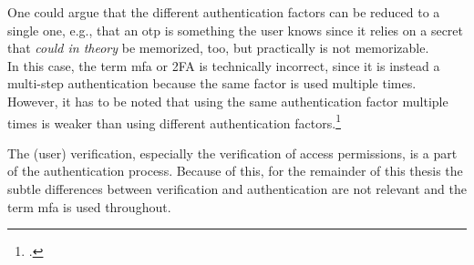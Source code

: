 One could argue that the different authentication factors can be reduced to a single one, e.g., that an \gls{otp} is \frqq something the user knows\flqq{} since it relies on a secret that \textit{could in theory} be memorized, too, but practically is not memorizable.\\
In this case, the term \gls{mfa} or 2FA is technically incorrect, since it is instead a multi-step authentication because the same factor is used multiple times. However, it has to be noted that using the same authentication factor multiple times is weaker than using different authentication factors.\footcite[See][117]{grimes2017hacking}

The (user) verification, especially the verification of access permissions, is a part of the authentication process. Because of this, for the remainder of this thesis the subtle differences between verification and authentication are not relevant and the term \gls{mfa} is used throughout.